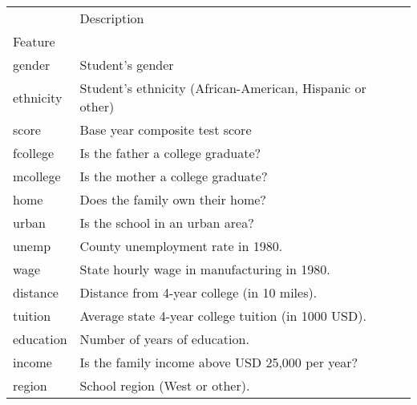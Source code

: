 \begin{tabu}{ll}
\toprule
 & Description \\
Feature &  \\
\midrule
gender & Student's gender \\
ethnicity & Student's ethnicity (African-American, Hispanic or other) \\
score & Base year composite test score \\
fcollege & Is the father a college graduate? \\
mcollege & Is the mother a college graduate? \\
home & Does the family own their home? \\
urban & Is the school in an urban area? \\
unemp & County unemployment rate in 1980. \\
wage & State hourly wage in manufacturing in 1980. \\
distance & Distance from 4-year college (in 10 miles). \\
tuition & Average state 4-year college tuition (in 1000 USD). \\
education & Number of years of education. \\
income & Is the family income above USD 25,000 per year? \\
region & School region (West or other). \\
\bottomrule
\end{tabu}
